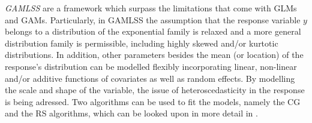 
\textit{\ac{GAMLSS}} \citep{rigby2001gamlss, rigby2005generalized} are a framework which surpass the limitations that come with \acp{GLM} and \acp{GAM}. Particularly, in \ac{GAMLSS} the assumption that the response variable $y$ belongs to a distribution of the exponential family is relaxed and a more general distribution family is permissible, including highly skewed and/or kurtotic distributions. In addition, other parameters besides the mean (or location) of the response's distribution can be modelled flexibly incorporating linear, non-linear and/or additive functions of covariates as well as random effects. By modelling the scale and shape of the variable, the issue of heteroscedasticity in the response is being adressed. Two algorithms can be used to fit the models, namely the CG and the RS algorithms, which can be looked upon in more detail in \cite{rigby2005generalized}.
\\

